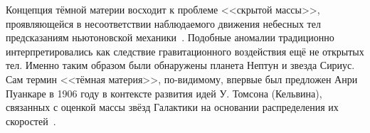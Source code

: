 Концепция тёмной материи восходит к проблеме <<скрытой массы>>,
проявляющейся в несоответствии наблюдаемого движения небесных тел
предсказаниям ньютоновской механики~\cite{hubble-distance}.
Подобные аномалии традиционно
интерпретировались как следствие гравитационного воздействия ещё
не открытых тел. Именно таким образом были обнаружены планета
Нептун и звезда Сириус. Сам термин <<тёмная материя>>, по-видимому,
впервые был предложен Анри Пуанкаре в 1906 году в контексте развития
идей У. Томсона (Кельвина), связанных с оценкой массы звёзд Галактики
на основании распределения их скоростей~\cite{bertone-history-of-dark-matter}.

